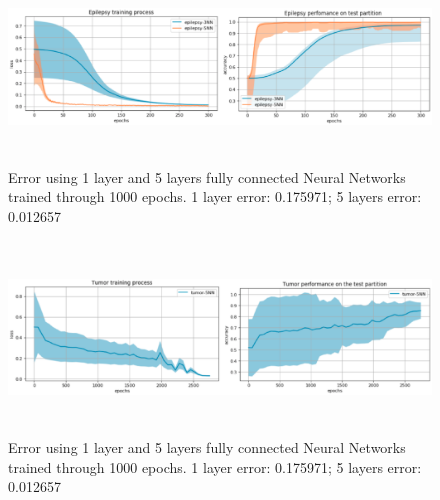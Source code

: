 \documentclass{llncs}       %
\begin{document}
\begin{figure}[h]
\centering
\includegraphics[width=12.08cm,height=5.11cm]{media/results.eps}
\caption{ Error using 1 layer and 5 layers fully connected Neural Networks trained through 1000 epochs. 1 layer error:  0.175971;  5 layers error:  0.012657}
\end{figure}



\begin{figure}[h]
\centering
\includegraphics[width=12.08cm,height=5.11cm]{media/results2.eps}
\caption{ Error using 1 layer and 5 layers fully connected Neural Networks trained through 1000 epochs. 1 layer error:  0.175971;  5 layers error:  0.012657}
\end{figure}



 

\paragraph{}\paragraph{}
\paragraph{}\paragraph{}
\end{document}
